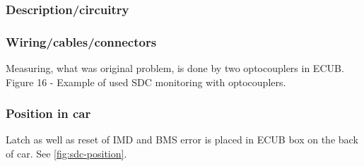 \subsubsection{Description/circuitry}

\subsubsection{Wiring/cables/connectors}
\iffalse Describe wiring, show schematics, describe connectors and cables used and show useful data regarding the wiring.  If not detailed in section 2.1, be sure to show how the device opens the shutdown circuit.\fi
Measuring, what was original problem, is done by two optocouplers in ECUB. Figure 16 - Example of used SDC monitoring with optocouplers.
\subsubsection{Position in car}
Latch as well as reset of IMD and BMS error is placed in ECUB box on the back of car. See \ref{fig:sdc-position}.